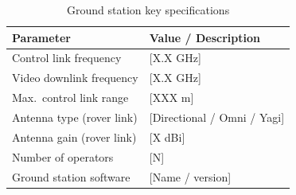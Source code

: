 \begin{table}[H]
    \centering
    \caption{Ground station key specifications}
    \label{tab:gs_specs}
    \begin{tabular}{L{5cm} L{7cm}}
        \toprule
        \textbf{Parameter}               & \textbf{Value / Description} \\
        \midrule
        Control link frequency           & [X.X GHz] \\
        Video downlink frequency         & [X.X GHz] \\
        Max.\ control link range         & [XXX m] \\
        Antenna type (rover link)        & [Directional / Omni / Yagi] \\
        Antenna gain (rover link)        & [X dBi] \\
        Number of operators              & [N] \\
        Ground station software          & [Name / version] \\
        \bottomrule
    \end{tabular}
\end{table}
